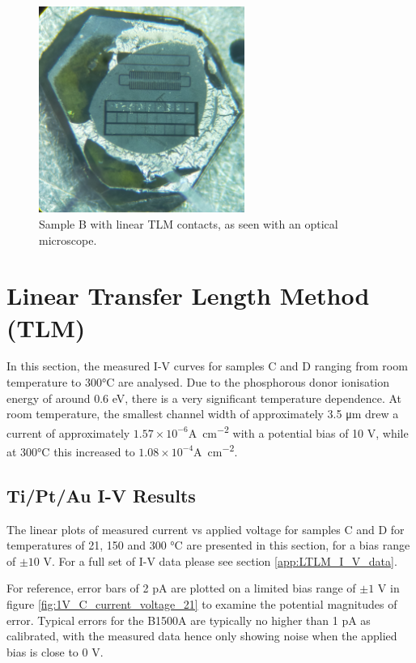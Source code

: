\begin{figure}[h]
\centering
\includegraphics[width=0.6\textwidth]{Chapter6/Figs/Raster/Sample D 2019/TLMB.jpg}
\caption{Sample B with linear TLM contacts, as seen with an optical microscope.}
\label{fig:TLMB}
\end{figure}

\section{Linear Transfer Length Method (TLM)}
In this section, the measured I-V curves for samples C and D ranging from room temperature to 300\si{\degreeCelsius} are analysed. Due to the phosphorous donor ionisation energy of around 0.6 \si{\electronvolt}, there is a very significant temperature dependence. At room temperature, the smallest channel width of approximately 3.5 \si{\micro\metre} drew a current of approximately $1.57\times10^{-6}$\si{\ampere\per\centi\metre\squared} with a potential bias of 10 \si{\volt}, while at 300\si{\degreeCelsius} this increased to $1.08\times10^{-4}$\si{\ampere\per\centi\metre\squared}. 

\subsection{Ti/Pt/Au I-V Results}
The linear plots of measured current vs applied voltage for samples C and D for temperatures of 21, 150 and 300 \si{\degreeCelsius} are presented in this section, for a bias range of $\pm10$ \si{\volt}. For a full set of I-V data please see section \ref{app:LTLM_I_V_data}.

For reference, error bars of 2 \si{\pico\ampere} are plotted on a limited bias range of $\pm1$ \si{\volt} in figure \ref{fig:1V_C_current_voltage_21} to examine the potential magnitudes of error. Typical errors for the B1500A are typically no higher than 1 \si{\pico\ampere} as calibrated, with the measured data hence only showing noise when the applied bias is close to 0 \si{\volt}.

